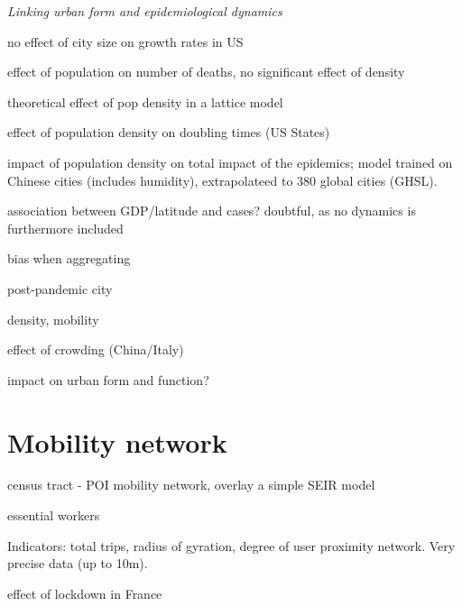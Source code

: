 \documentclass[10pt]{article}
\begin{document}
\textit{Linking urban form and epidemiological dynamics}


\cite{2020arXiv200401248H} no effect of city size on growth rates in US
	
\cite{angel2020coronavirus} effect of population on number of deaths, no significant effect of density

\cite{tarwater2001effects} theoretical effect of pop density in a lattice model	

\cite{White2020.04.14.20065318} effect of population density on doubling times (US States)
	
\cite{Rader2020.04.15.20064980} impact of population density on total impact of the epidemics; model trained on Chinese cities (includes humidity), extrapolateed to 380 global cities (GHSL).

\cite{2020arXiv200400110M} association between GDP/latitude and cases? doubtful, as no dynamics is furthermore included

\cite{2020arXiv200412994B} bias when aggregating

\cite{doi:10.1177/2399808320926912} post-pandemic city

\cite{bouffanais2020cities} density, mobility

	
\cite{rader2020crowding} effect of crowding (China/Italy)
	
\cite{batty2020social} impact on urban form and function?

\cite{huanglarge}

\cite{ivey2020land}

\cite{paez2021reproducibility}

	
\section{Mobility network}


\cite{kim2021impact}

\cite{chang2020mobility} census tract - POI mobility network, overlay a simple SEIR model

\cite{batty2020london} essential workers

	
\cite{Pepe2020.03.22.20039933} Indicators: total trips, radius of gyration, degree of user proximity network. Very precise data (up to 10m).

\cite{pullano2020population} effect of lockdown in France


\end{document}
